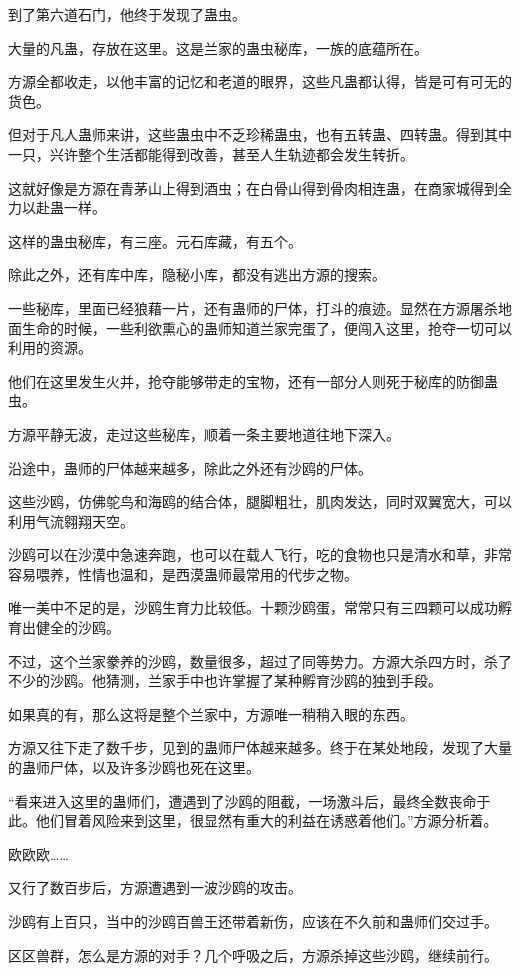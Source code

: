 \begin{this_body}
到了第六道石门，他终于发现了蛊虫。

大量的凡蛊，存放在这里。这是兰家的蛊虫秘库，一族的底蕴所在。

方源全都收走，以他丰富的记忆和老道的眼界，这些凡蛊都认得，皆是可有可无的货色。

但对于凡人蛊师来讲，这些蛊虫中不乏珍稀蛊虫，也有五转蛊、四转蛊。得到其中一只，兴许整个生活都能得到改善，甚至人生轨迹都会发生转折。

这就好像是方源在青茅山上得到酒虫；在白骨山得到骨肉相连蛊，在商家城得到全力以赴蛊一样。

这样的蛊虫秘库，有三座。元石库藏，有五个。

除此之外，还有库中库，隐秘小库，都没有逃出方源的搜索。

一些秘库，里面已经狼藉一片，还有蛊师的尸体，打斗的痕迹。显然在方源屠杀地面生命的时候，一些利欲熏心的蛊师知道兰家完蛋了，便闯入这里，抢夺一切可以利用的资源。

他们在这里发生火并，抢夺能够带走的宝物，还有一部分人则死于秘库的防御蛊虫。

方源平静无波，走过这些秘库，顺着一条主要地道往地下深入。

沿途中，蛊师的尸体越来越多，除此之外还有沙鸥的尸体。

这些沙鸥，仿佛鸵鸟和海鸥的结合体，腿脚粗壮，肌肉发达，同时双翼宽大，可以利用气流翱翔天空。

沙鸥可以在沙漠中急速奔跑，也可以在载人飞行，吃的食物也只是清水和草，非常容易喂养，性情也温和，是西漠蛊师最常用的代步之物。

唯一美中不足的是，沙鸥生育力比较低。十颗沙鸥蛋，常常只有三四颗可以成功孵育出健全的沙鸥。

不过，这个兰家豢养的沙鸥，数量很多，超过了同等势力。方源大杀四方时，杀了不少的沙鸥。他猜测，兰家手中也许掌握了某种孵育沙鸥的独到手段。

如果真的有，那么这将是整个兰家中，方源唯一稍稍入眼的东西。

方源又往下走了数千步，见到的蛊师尸体越来越多。终于在某处地段，发现了大量的蛊师尸体，以及许多沙鸥也死在这里。

“看来进入这里的蛊师们，遭遇到了沙鸥的阻截，一场激斗后，最终全数丧命于此。他们冒着风险来到这里，很显然有重大的利益在诱惑着他们。”方源分析着。

欧欧欧……

又行了数百步后，方源遭遇到一波沙鸥的攻击。

沙鸥有上百只，当中的沙鸥百兽王还带着新伤，应该在不久前和蛊师们交过手。

区区兽群，怎么是方源的对手？几个呼吸之后，方源杀掉这些沙鸥，继续前行。


\end{this_body}
